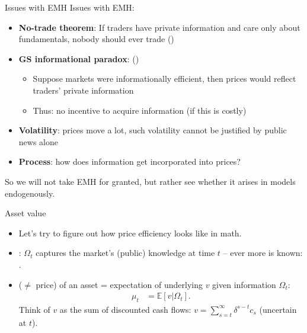\documentclass[english,10pt
,aspectratio=169
]{beamer}
\begin{document}
\begin{frame}{Issues with EMH}
Issues with EMH:
\begin{itemize}[<+->]
	\item \textbf{No-trade theorem}: If traders have private information and care only about fundamentals, nobody should ever trade (\cite{milgrom_information_1982})
	\item \textbf{GS informational paradox}: (\cite{grossman_impossibility_1980})
	\begin{itemize}
		\item Suppose markets were informationally efficient, then prices would reflect traders' private information
		\item Thus: no incentive to acquire information (if this is costly)
	\end{itemize} 
	\item \textbf{Volatility}: prices move a lot, such volatility cannot be justified by public news alone
	\item \textbf{Process}: \alert{how} does information get incorporated into prices?
\end{itemize}
\pause[6]
So we will not take EMH for granted, but rather see whether it arises in models endogenously.
\end{frame}


\begin{frame}{Asset value}
	\begin{itemize}
		\item Let's try to figure out how price efficiency looks like in math.
		\item {}: $\Omega_t$ captures the market's (public) knowledge at time $t$ -- ever more is known: 
		. 
		
		\item {} ($\neq$ price) of an asset = expectation of underlying  $v$ given information $\Omega_{t}$:
		\begin{align*}
			\mu_t &= \mathbb{E} \left[ v | \Omega_t \right].
		\end{align*}
		Think of $v$ as the sum of discounted cash flows: $v = \sum_{s=t}^{\infty} \delta^{s-t} c_s$ (uncertain at $t$).
	\end{itemize}
\end{frame}
\end{document}
